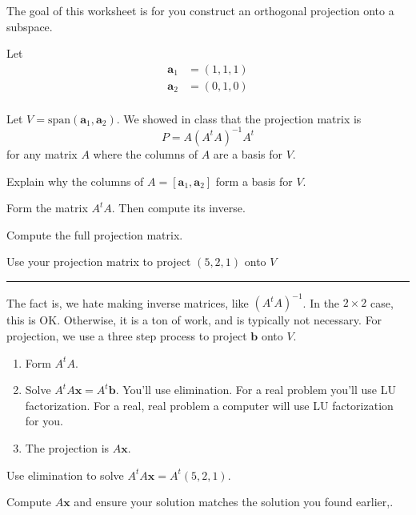 \documentclass[minion]{homework}
\def\vx{\mathbf{x}}
\def\va{\mathbf{a}}
\def\vb{\mathbf{b}}
\begin{document}
\begin{aproblems}
\vskip 0.5cm

The goal of this worksheet is for you construct an orthogonal
projection onto a subspace.

Let
\[
\begin{aligned}
\va_1 &= (1,1,1)\\
\va_2 &= (0,1,0)\\
\end{aligned}
\]

Let $V=\text{span}(\va_1,\va_2)$. We showed in class that
the projection matrix is
\[
P = A(A^t A)^{-1}A^t
\]
for any matrix $A$ where the columns of $A$ are a basis for $V$.

\aproblem Explain why the columns of $A=[\va_1,\va_2]$ form a basis for $V$.

\aproblem Form the matrix $A^t A$.  Then compute its inverse.

\aproblem Compute the full projection matrix.

\aproblem Use your projection matrix to project $(5,2,1)$ onto $V$
\vskip 1cm
\hrule
The fact is, we hate making inverse matrices, like $(A^tA)^{-1}$.  
In the $2\times 2$
case, this is OK.  Otherwise, it is a ton of work, and is typically not necessary.  For projection, we use a three step process to project $\vb$
onto $V$.
\begin{enumerate}
\item Form $A^t A$.
\item Solve $A^t A \vx = A^t\vb$.  You'll use elimination. For a real problem
you'll use LU factorization.  For a real, real problem a computer will
use LU factorization for you.
\item The projection is $A \vx$.
\end{enumerate}

\aproblem Use elimination to solve $A^t A \vx=A^t(5,2,1)$.

\aproblem Compute $A\vx$ and ensure your solution matches the solution
you found earlier,.

\end{aproblems}
\end{document}
